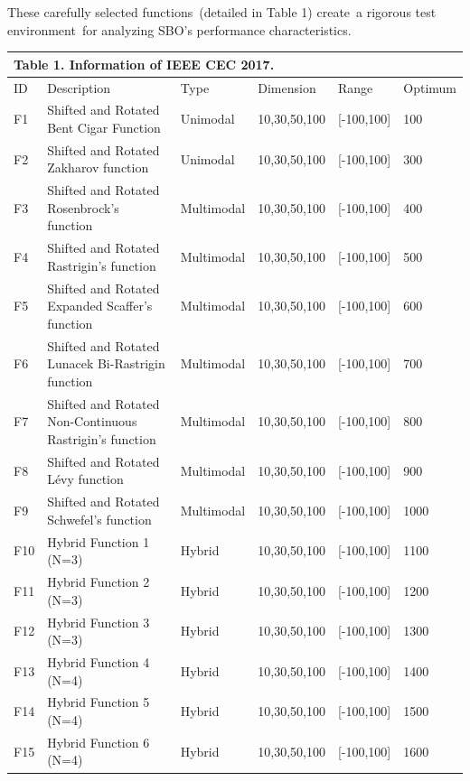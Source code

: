 \documentclass{article} %
\begin{document}
These carefully selected functions~(detailed in Table 1) create~a rigorous test environment~for analyzing SBO's performance characteristics.



\noindent \textbf{}

\begin{tabular}{|p{0.3in}|p{1.5in}|p{0.5in}|p{0.5in}|p{0.5in}|p{0.5in}|} \hline 
\multicolumn{6}{|p{1in}|}{\textbf{Table }1\textbf{.} Information of IEEE CEC 2017.\textbf{}} \\ \hline 
ID & Description & Type & Dimension & Range & Optimum \\ \hline 
F1 & Shifted and Rotated Bent Cigar Function & Unimodal & 10,30,50,100 & [-100,100] & 100 \\ \hline 
F2 & Shifted and Rotated Zakharov function & Unimodal & 10,30,50,100 & [-100,100] & 300 \\ \hline 
F3 & Shifted and Rotated Rosenbrock's function & Multimodal & 10,30,50,100 & [-100,100] & 400 \\ \hline 
F4 & Shifted and Rotated Rastrigin's function & Multimodal & 10,30,50,100 & [-100,100] & 500 \\ \hline 
F5 & Shifted and Rotated Expanded Scaffer's function & Multimodal & 10,30,50,100 & [-100,100] & 600 \\ \hline 
F6 & Shifted and Rotated Lunacek Bi-Rastrigin function & Multimodal & 10,30,50,100 & [-100,100] & 700 \\ \hline 
F7 & Shifted and Rotated Non-Continuous Rastrigin's function & Multimodal & 10,30,50,100 & [-100,100] & 800 \\ \hline 
F8 & Shifted and Rotated L\'{e}vy function & Multimodal & 10,30,50,100 & [-100,100] & 900 \\ \hline 
F9 & Shifted and Rotated Schwefel's function & Multimodal & 10,30,50,100 & [-100,100] & 1000 \\ \hline 
F10 & Hybrid Function 1 (N=3) & Hybrid & 10,30,50,100 & [-100,100] & 1100 \\ \hline 
F11 & Hybrid Function 2 (N=3) & Hybrid & 10,30,50,100 & [-100,100] & 1200 \\ \hline 
F12 & Hybrid Function 3 (N=3) & Hybrid & 10,30,50,100 & [-100,100] & 1300 \\ \hline 
F13 & Hybrid Function 4 (N=4) & Hybrid & 10,30,50,100 & [-100,100] & 1400 \\ \hline 
F14 & Hybrid Function 5 (N=4) & Hybrid & 10,30,50,100 & [-100,100] & 1500 \\ \hline 
F15 & Hybrid Function 6 (N=4) & Hybrid & 10,30,50,100 & [-100,100] & 1600 \\ \hline 

\end{tabular}
\end{document}
